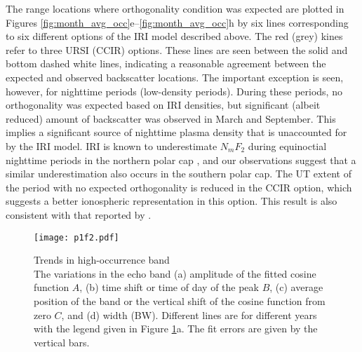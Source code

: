 The range locations where orthogonality condition was expected are plotted in Figures \ref{fig:month_avg_occ}e--\ref{fig:month_avg_occ}h by six lines corresponding to six different options of the IRI model described above.  The red (grey) kines refer to three URSI (CCIR) options.  These lines are seen between the solid and bottom dashed white lines, indicating a reasonable agreement between the expected and observed backscatter locations.  The important exception is seen, however, for nighttime periods (low-density periods).  During these periods, no orthogonality was expected based on IRI densities, but significant (albeit reduced) amount of backscatter was observed in March and September.  This implies a significant source of nighttime plasma density that is unaccounted for by the IRI model.  IRI is known to underestimate \(N_mF_2\) during equinoctial nighttime periods in the northern polar cap \citep{Themens2014}, and our observations suggest that a similar underestimation also occurs in the southern polar cap.  The UT extent of the period with no expected orthogonality is reduced in the CCIR option, which suggests a better ionospheric representation in this option.  This result is also consistent with that reported by \citet{Themens2014}.

\begin{figure}
	\centering
	\texttt{[image: p1f2.pdf]}
	\caption[Trends in high-occurrence band]{{\:}Trends in high-occurrence band\\ The variations in the echo band (a) amplitude of the fitted cosine function \(A\), (b) time shift or time of day of the peak \(B\), (c) average position of the band or the vertical shift of the cosine function from zero \(C\), and (d) width (BW). Different lines are for different years with the legend given in Figure \ref{fig:year_line}a.  The fit errors are given by the vertical bars.}
	\label{fig:year_line}
\end{figure}

